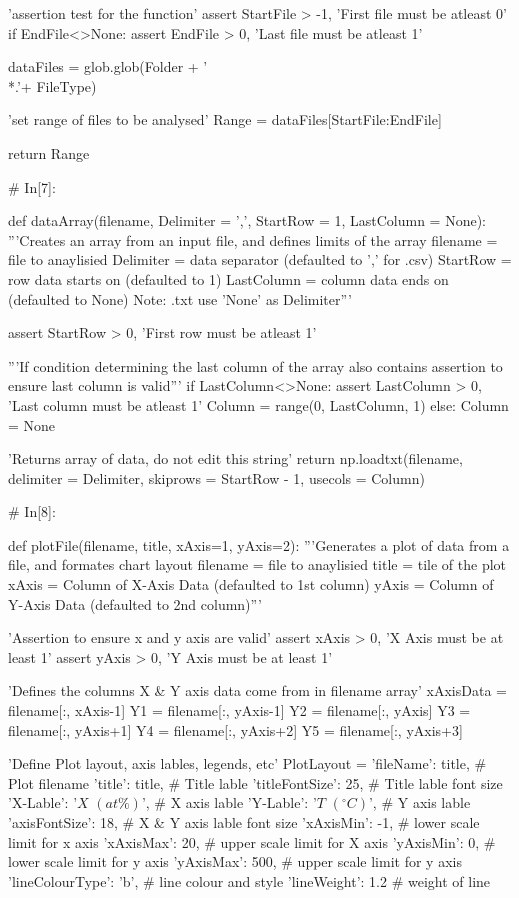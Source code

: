 \documentclass[a4paper,8pt]{article}
\begin{document}
\begin{python}
'assertion test for the function'
assert StartFile > -1, 'First file must be atleast 0'
if EndFile<>None:
assert EndFile > 0, 'Last file must be atleast 1'

dataFiles = glob.glob(Folder + '\\*.'+ FileType)

'set range of files to be analysed'
Range = dataFiles[StartFile:EndFile]

return Range


# In[7]:

def dataArray(filename, Delimiter = ',', StartRow = 1, LastColumn = None):
'''Creates an array from an input file, and defines limits of the array
filename = file to anaylisied
Delimiter = data separator (defaulted to ',' for .csv)
StartRow = row data starts on (defaulted to 1)
LastColumn = column data ends on (defaulted to None)
Note: .txt use 'None' as Delimiter'''

assert StartRow > 0, 'First row must be atleast 1'

'''If condition determining the last column of the array
also contains assertion to ensure last column is valid'''
if LastColumn<>None:
assert LastColumn > 0, 'Last column must be atleast 1'
Column = range(0, LastColumn, 1)
else:
Column = None

'Returns array of data, do not edit this string'
return np.loadtxt(filename, delimiter = Delimiter,
skiprows = StartRow - 1, 
usecols = Column)


# In[8]:

def plotFile(filename, title, xAxis=1, yAxis=2):
'''Generates a plot of data from a file, and formates chart layout
filename = file to anaylisied
title = tile of the plot
xAxis = Column of X-Axis Data (defaulted to 1st column)
yAxis = Column of Y-Axis Data (defaulted to 2nd column)'''

'Assertion to ensure x and y axis are valid'
assert xAxis > 0, 'X Axis must be at least 1'
assert yAxis > 0, 'Y Axis must be at least 1'

'Defines the columns X & Y axis data come from in filename array'
xAxisData = filename[:, xAxis-1]
Y1 = filename[:, yAxis-1]
Y2 = filename[:, yAxis]
Y3 = filename[:, yAxis+1]
Y4 = filename[:, yAxis+2]
Y5 = filename[:, yAxis+3]

'Define Plot layout, axis lables, legends, etc'
PlotLayout = {'fileName': title, # Plot filename 
	'title': title, # Title lable
	'titleFontSize': 25, # Title lable font size
	'X-Lable': '$X$ $(at\%)$', # X axis lable
	'Y-Lable': '$T$  $(^{\circ}C)$', # Y axis lable
	'axisFontSize': 18, # X & Y axis lable font size
	'xAxisMin': -1, # lower scale limit for x axis
	'xAxisMax': 20, # upper scale limit for X axis
	'yAxisMin': 0, # lower scale limit for y axis
	'yAxisMax': 500, # upper scale limit for y axis
	'lineColourType': 'b', # line colour and style
	'lineWeight': 1.2 # weight of line
}


\end{python}
\end{document}
